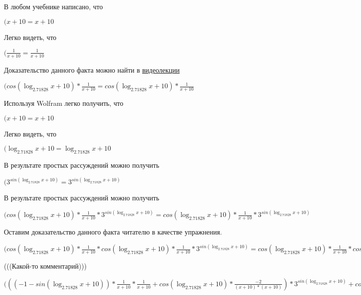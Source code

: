 \documentclass[12pt,a4paper,fleqn]{article}
\theoremstyle{definition}
\begin{document}
В любом учебнике написано, что

$( x  +  10  =  x  +  10 $

Легко видеть, что

$(\frac{ 1 }{ x  +  10 }
 = \frac{ 1 }{ x  +  10 }
$

Доказательство данного факта можно найти в \href{https://www.youtube.com/watch?v=dQw4w9WgXcQ}{видеолекции}

$(cos(\log_{ 2.71828 }{ x  +  10 }) * \frac{ 1 }{ x  +  10 }
 = cos(\log_{ 2.71828 }{ x  +  10 }) * \frac{ 1 }{ x  +  10 }
$

Используя Wolfram легко получить, что

$( x  +  10  =  x  +  10 $

Легко видеть, что

$(\log_{ 2.71828 }{ x  +  10 } = \log_{ 2.71828 }{ x  +  10 }$

В результате простых рассуждений можно получить

$({ 3 }^{sin(\log_{ 2.71828 }{ x  +  10 })} = { 3 }^{sin(\log_{ 2.71828 }{ x  +  10 })}$

В результате простых рассуждений можно получить

$(cos(\log_{ 2.71828 }{ x  +  10 }) * \frac{ 1 }{ x  +  10 }
 * { 3 }^{sin(\log_{ 2.71828 }{ x  +  10 })} = cos(\log_{ 2.71828 }{ x  +  10 }) * \frac{ 1 }{ x  +  10 }
 * { 3 }^{sin(\log_{ 2.71828 }{ x  +  10 })}$

Оставим доказательство данного факта читателю в качестве упражнения.

$(cos(\log_{ 2.71828 }{ x  +  10 }) * \frac{ 1 }{ x  +  10 }
 * cos(\log_{ 2.71828 }{ x  +  10 }) * \frac{ 1 }{ x  +  10 }
 * { 3 }^{sin(\log_{ 2.71828 }{ x  +  10 })} = cos(\log_{ 2.71828 }{ x  +  10 }) * \frac{ 1 }{ x  +  10 }
 * cos(\log_{ 2.71828 }{ x  +  10 }) * \frac{ 1 }{ x  +  10 }
 * { 3 }^{sin(\log_{ 2.71828 }{ x  +  10 })}$

(((Какой-то комментарий)))

$((( -1  - sin(\log_{ 2.71828 }{ x  +  10 })) * \frac{ 1 }{ x  +  10 }
 * \frac{ 1 }{ x  +  10 }
 + cos(\log_{ 2.71828 }{ x  +  10 }) * \frac{ -2 }{( x  +  10 ) * ( x  +  10 )}
) * { 3 }^{sin(\log_{ 2.71828 }{ x  +  10 })} + cos(\log_{ 2.71828 }{ x  +  10 }) * \frac{ 1 }{ x  +  10 }
 * cos(\log_{ 2.71828 }{ x  +  10 }) * \frac{ 1 }{ x  +  10 }
 * { 3 }^{sin(\log_{ 2.71828 }{ x  +  10 })} = (( -1  - sin(\log_{ 2.71828 }{ x  +  10 })) * \frac{ 1 }{ x  +  10 }
 * \frac{ 1 }{ x  +  10 }
 + cos(\log_{ 2.71828 }{ x  +  10 }) * \frac{ -2 }{( x  +  10 ) * ( x  +  10 )}
) * { 3 }^{sin(\log_{ 2.71828 }{ x  +  10 })} + cos(\log_{ 2.71828 }{ x  +  10 }) * \frac{ 1 }{ x  +  10 }
 * cos(\log_{ 2.71828 }{ x  +  10 }) * \frac{ 1 }{ x  +  10 }
 * { 3 }^{sin(\log_{ 2.71828 }{ x  +  10 })}$
\end{document}
